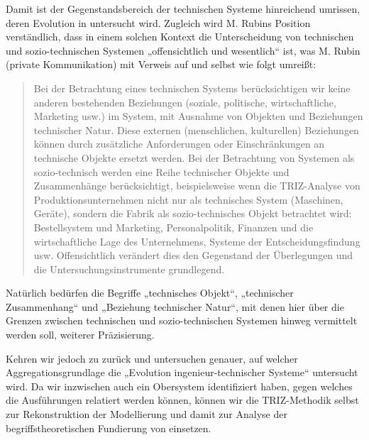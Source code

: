 \documentclass[11pt,a4paper]{article}
\begin{document}
Damit ist der Gegenstandsbereich der technischen Systeme hinreichend umrissen,
deren Evolution in \cite{TESE2018} untersucht wird. Zugleich wird M. Rubins
Position verständlich, dass in einem solchen Kontext die Unterscheidung von
technischen und sozio-technischen Systemen „offensichtlich und wesentlich“
ist, was M. Rubin (private Kommunikation) mit Verweis auf \cite{Rubin2007} und
\cite{Rubin2010} selbst wie folgt umreißt:
\begin{quote}
  Bei der Betrachtung eines technischen Systems berücksichtigen wir keine
  anderen bestehenden Beziehungen (soziale, politische, wirtschaftliche,
  Marketing usw.) im System, mit Ausnahme von Objekten und Beziehungen
  technischer Natur. Diese externen (menschlichen, kulturellen) Beziehungen
  können durch zusätzliche Anforderungen oder Einschränkungen an technische
  Objekte ersetzt werden.  Bei der Betrachtung von Systemen als
  sozio-technisch werden eine Reihe technischer Objekte und Zusammenhänge
  berücksichtigt, beispielsweise wenn die TRIZ-Analyse von
  Produktionsunternehmen nicht nur als technisches System (Maschinen, Geräte),
  sondern die Fabrik als sozio-technisches Objekt betrachtet wird:
  Bestellsystem und Marketing, Personalpolitik, Finanzen und die
  wirtschaftliche Lage des Unternehmens, Systeme der Entscheidungsfindung usw.
  Offensichtlich verändert dies den Gegenstand der Überlegungen und die
  Untersuchungsinstrumente grundlegend.
\end{quote}
Natürlich bedürfen die Begriffe „technisches Objekt“, „technischer
Zusammenhang“ und „Beziehung technischer Natur“, mit denen hier über die
Grenzen zwischen technischen und sozio-technischen Systemen hinweg vermittelt
werden soll, weiterer Präzisierung.

Kehren wir jedoch zu \cite{TESE2018} zurück und untersuchen genauer, auf
welcher Aggregationsgrundlage die „Evolution ingenieur-technischer Systeme“
untersucht wird.  Da wir inzwischen auch ein Obersystem identifiziert haben,
gegen welches die Ausführungen relatiert werden können, können wir die
TRIZ-Methodik selbst zur Rekonstruktion der Modellierung und damit zur Analyse
der begriffstheoretischen Fundierung von \cite{TESE2018} einsetzen.
\end{document}

